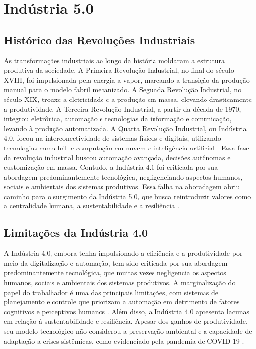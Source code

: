 
\chapter{Indústria 5.0}\label{cap:indutria5_0}
\section{Histórico das Revoluções Industriais}

As transformações industriais ao longo da história moldaram a estrutura produtiva da sociedade. A Primeira Revolução Industrial, no final do século XVIII, foi impulsionada pela energia a vapor, marcando a transição da produção manual para o modelo fabril mecanizado. A Segunda Revolução Industrial, no século XIX, trouxe a eletricidade e a produção em massa, elevando drasticamente a produtividade. A Terceira Revolução Industrial, a partir da década de 1970, integrou eletrônica, automação e tecnologias da informação e comunicação, levando à produção automatizada.
A Quarta Revolução Industrial, ou Indústria 4.0, focou na interconectividade de sistemas físicos e digitais, utilizando tecnologias como \gls{IoT} e computação em nuvem e inteligência artificial \cite{VALETTE2023}. Essa fase da revolução industrial buscou automação avançada, decisões autônomas e customização em massa. Contudo, a Indústria 4.0 foi criticada por sua abordagem predominantemente tecnológica, negligenciando aspectos humanos, sociais e ambientais dos sistemas produtivos. Essa falha na aboradagem abriu caminho para o surgimento da Indústria 5.0, que busca reintroduzir valores como a centralidade humana, a sustentabilidade e a resiliência \cite{Xu2021, PIZON2023}.

\section{Limitações da Indústria 4.0}

A Indústria 4.0, embora tenha impulsionado a eficiência e a produtividade por meio da digitalização e automação, tem sido criticada por sua abordagem predominantemente tecnológica, que muitas vezes negligencia os aspectos humanos, sociais e ambientais dos sistemas produtivos. A marginalização do papel do trabalhador é uma das principais limitações, com sistemas de planejamento e controle que priorizam a automação em detrimento de fatores cognitivos e perceptivos humanos \cite{RANNERTSHAUSER2022}. Além disso, a Indústria 4.0 apresenta lacunas em relação à sustentabilidade e resiliência. Apesar dos ganhos de produtividade, seu modelo tecnológico não considerou a preservação ambiental e a capacidade de adaptação a crises sistêmicas, como evidenciado pela pandemia de COVID-19 \cite{euCommission2021, Khan2023}.


